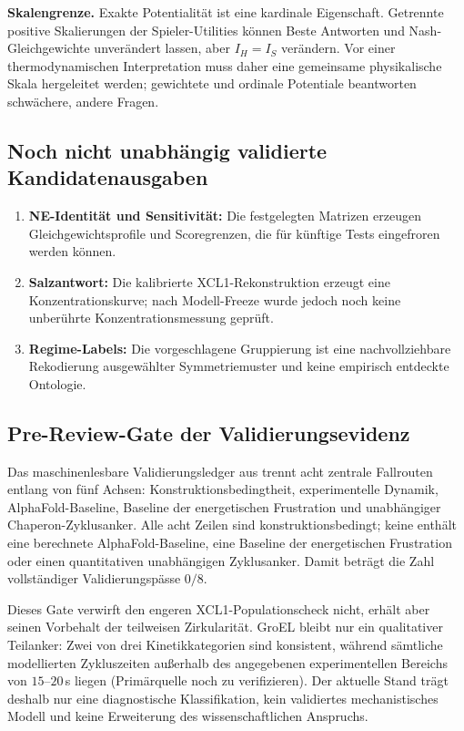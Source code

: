 \documentclass[12pt,a4paper]{article}
\begin{document}
\noindent\textbf{Skalengrenze.} Exakte Potentialität ist eine kardinale
Eigenschaft. Getrennte positive Skalierungen der Spieler-Utilities
können Beste Antworten und Nash-Gleichgewichte unverändert lassen, aber
$I_H=I_S$ verändern. Vor einer thermodynamischen Interpretation muss
daher eine gemeinsame physikalische Skala hergeleitet werden;
gewichtete und ordinale Potentiale beantworten schwächere, andere
Fragen.

\subsection{Noch nicht unabhängig validierte Kandidatenausgaben}

\begin{enumerate}
  \item \textbf{NE-Identität und Sensitivität:} Die festgelegten
    Matrizen erzeugen Gleichgewichtsprofile und Scoregrenzen, die für
    künftige Tests eingefroren werden können.
  \item \textbf{Salzantwort:} Die kalibrierte XCL1-Rekonstruktion
    erzeugt eine Konzentrationskurve; nach Modell-Freeze wurde jedoch
    noch keine unberührte Konzentrationsmessung geprüft.
  \item \textbf{Regime-Labels:} Die vorgeschlagene Gruppierung ist eine
    nachvollziehbare Rekodierung ausgewählter Symmetriemuster und keine
    empirisch entdeckte Ontologie.
\end{enumerate}

\subsection{Pre-Review-Gate der Validierungsevidenz}

Das maschinenlesbare Validierungsledger aus
 trennt acht zentrale
Fallrouten entlang von fünf Achsen: Konstruktionsbedingtheit,
experimentelle Dynamik, AlphaFold-Baseline, Baseline der energetischen
Frustration und unabhängiger Chaperon-Zyklusanker. Alle acht Zeilen sind
konstruktionsbedingt; keine enthält eine berechnete AlphaFold-Baseline,
eine Baseline der energetischen Frustration oder einen quantitativen
unabhängigen Zyklusanker. Damit beträgt die Zahl vollständiger
Validierungspässe $0/8$.

Dieses Gate verwirft den engeren XCL1-Populationscheck nicht, erhält aber
seinen Vorbehalt der teilweisen Zirkularität. GroEL bleibt nur ein
qualitativer Teilanker: Zwei von drei Kinetikkategorien sind konsistent,
während sämtliche modellierten Zykluszeiten außerhalb des angegebenen
experimentellen Bereichs von $15$--$20$\,s liegen
(Primärquelle noch zu verifizieren). Der aktuelle Stand
trägt deshalb nur eine diagnostische Klassifikation, kein validiertes
mechanistisches Modell und keine Erweiterung des wissenschaftlichen Anspruchs.
\end{document}
